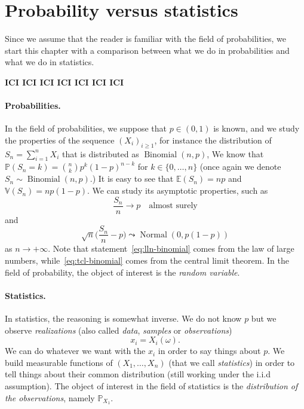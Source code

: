 \documentclass[
	fontsize=11pt, %
	twoside=false, %
	numbers=noenddot, %
]{kaobook}
\DeclareMathOperator{\nor}{Normal}
\DeclareMathOperator{\bin}{Binomial}
\renewcommand{\P}{\mathbb P}
\newcommand{\E}{\mathbb E}
\newcommand{\var}{\mathbb V}
\begin{document}
\section{Probability versus statistics} %
\label{sec:probability_versus_statistics}

Since we assume that the reader is familiar with the field of probabilities, we start this chapter with a comparison between what we do in probabilities and what we do in statistics.

\textbf{ICI ICI ICI ICI ICI ICI ICI}

\paragraph{Probabilities.} %

In the field of probabilities, we suppose that $p \in (0, 1)$ is known, and we study the properties of the sequence $(X_i)_{i \geq 1}$, for instance the distribution of $S_n = \sum_{i=1}^n X_i$ that is distributed as $\bin(n, p)$,  
We know that $\P(S_n = k) = \binom{n}{k} p^k (1 - p)^{n-k}$ for $k \in \{0, \ldots, n\}$ (once again we denote $S_n \sim \bin(n, p)$.)
It is easy to see that $\E(S_n) = np$ and $\var(S_n) = np (1 - p)$.
We can study its asymptotic properties, such as 
\begin{equation}
	\label{eq:lln-binomial}
	\frac{S_n}{n} \rightarrow p	\quad \text{almost surely}
\end{equation}
and
\begin{equation}
	\label{eq:tcl-binomial}
	\sqrt n \Big(\frac{S_n}{n} - p\Big) \leadsto \nor(0, p(1-p))
\end{equation}
as $n \rightarrow +\infty$.
Note that statement~\eqref{eq:lln-binomial} comes from the law of large numbers, while~\eqref{eq:tcl-binomial} comes from the central limit theorem.
In the field of probability, the object of interest is the \emph{random variable}.

\paragraph{Statistics.} %
\label{par:statistics}

In statistics, the reasoning is somewhat inverse. We do not know $p$ but we observe \emph{realizations} (also called \emph{data}, \emph{samples} or \emph{observations})
\begin{equation*}
	x_i = X_i(\omega).
\end{equation*}
We can do whatever we want with the $x_i$ in order to say things about $p$.
We build measurable functions of $(X_1, \ldots, X_n)$ (that we call \emph{statistics}) in order to tell things about their common distribution (still working under the i.i.d assumption).
The object of interest in the field of statistics is the \emph{distribution of the observations}, namely $\P_{X_1}$.
\end{document}
